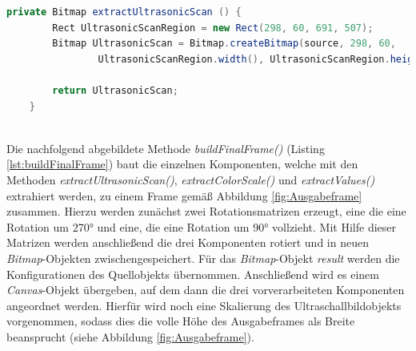 \begin{lstlisting}[caption=Methode \textit{extractUltrasonicScan()} zum Ausschneiden des Ultraschallbildbereichs aus dem Originalframe, label=lst:extractUltrasonicScan, language=Java]
private Bitmap extractUltrasonicScan () {
        Rect UltrasonicScanRegion = new Rect(298, 60, 691, 507);
        Bitmap UltrasonicScan = Bitmap.createBitmap(source, 298, 60,
                UltrasonicScanRegion.width(), UltrasonicScanRegion.height());

        return UltrasonicScan;
    }
\end{lstlisting}

~\\
Die nachfolgend abgebildete Methode \textit{buildFinalFrame()} (Listing \ref{lst:buildFinalFrame}) baut die einzelnen Komponenten, welche mit den Methoden \textit{extractUltrasonicScan()}, \textit{extractColorScale()} und \textit{extractValues()} extrahiert werden, zu einem Frame gemäß Abbildung \ref{fig:Ausgabeframe} zusammen. Hierzu werden zunächst zwei Rotationsmatrizen erzeugt, eine die eine Rotation um 270° und eine, die eine Rotation um 90° vollzieht. Mit Hilfe dieser Matrizen werden anschließend die drei Komponenten rotiert und in neuen \textit{Bitmap}-Objekten zwischengespeichert. Für das \textit{Bitmap}-Objekt \textit{result} werden die Konfigurationen des Quellobjekts übernommen. Anschließend wird es einem \textit{Canvas}-Objekt übergeben, auf dem dann die drei vorverarbeiteten Komponenten angeordnet werden. Hierfür wird noch eine Skalierung des Ultraschallbildobjekts vorgenommen, sodass dies die volle Höhe des Ausgabeframes als Breite beansprucht (siehe Abbildung \ref{fig:Ausgabeframe}).
\clearpage

